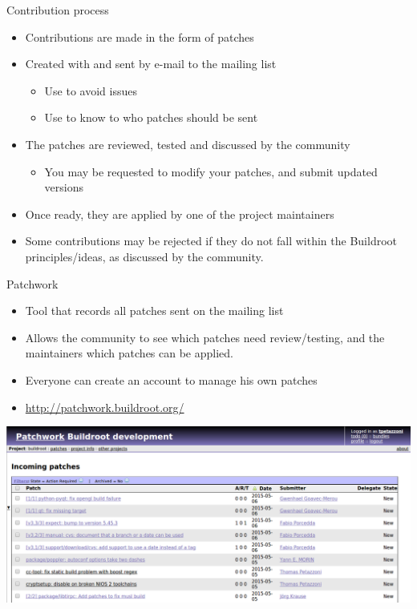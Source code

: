 \begin{frame}{Contribution process}
  \begin{itemize}
  \item Contributions are made in the form of patches
  \item Created with  and sent by e-mail to the mailing list
    \begin{itemize}
    \item Use  to avoid issues
    \item Use  to know to who patches should be
      sent
    \end{itemize}
  \item The patches are reviewed, tested and discussed by the
    community
    \begin{itemize}
    \item You may be requested to modify your patches, and submit
      updated versions
    \end{itemize}
  \item Once ready, they are applied by one of the project maintainers
  \item Some contributions may be rejected if they do not fall within
    the Buildroot principles/ideas, as discussed by the community.
  \end{itemize}
\end{frame}

\begin{frame}{Patchwork}
  \begin{itemize}
  \item Tool that records all patches sent on the mailing list
  \item Allows the community to see which patches need review/testing,
    and the maintainers which patches can be applied.
  \item Everyone can create an account to manage his own patches
  \item \url{http://patchwork.buildroot.org/}
  \end{itemize}

  \begin{center}
    \includegraphics[height=0.8\textheight]{slides/buildroot-support-contribution/patchwork.png}
  \end{center}
\end{frame}

